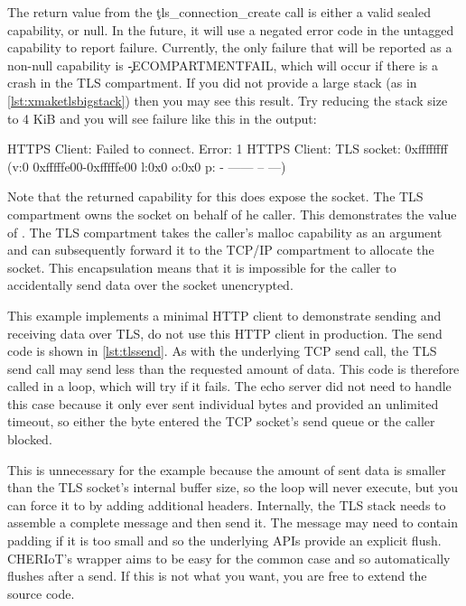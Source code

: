 \codelisting[filename=examples/tls/https.cc,marker=tls_connect,label=lst:tlsconnect,caption="Connecting to a remote server with TLS."]{}

The return value from the \c{tls_connection_create} call is either a valid sealed capability, or null.
In the future, it will use a negated error code in the untagged capability to report failure.
Currently, the only failure that will be reported as a non-null capability is \c{-ECOMPARTMENTFAIL}, which will occur if there is a crash in the TLS compartment.
If you did not provide a large stack (as in \ref{lst:xmaketlsbigstack}) then you may see this result.
Try reducing the stack size to 4 KiB and you will see failure like this in the output:

\begin{console}
HTTPS Client: Failed to connect.  Error: 1
HTTPS Client: TLS socket: 0xffffffff (v:0 0xfffffe00-0xfffffe00 l:0x0 o:0x0 p: - ------ -- ---)
\end{console}

Note that the returned capability for this does  expose the socket.
The TLS compartment owns the socket on behalf of he caller.
This demonstrates the value of .
The TLS compartment takes the caller's malloc capability as an argument and can subsequently forward it to the TCP/IP compartment to allocate the socket.
This encapsulation means that it is impossible for the caller to accidentally send data over the socket unencrypted.

This example implements a minimal HTTP client to demonstrate sending and receiving data over TLS, do not use this HTTP client in production.
The send code is shown in \ref{lst:tlssend}.
As with the underlying TCP send call, the TLS send call may send less than the requested amount of data.
This code is therefore called in a loop, which will try if it fails.
The echo server did not need to handle this case because it only ever sent individual bytes and provided an unlimited timeout, so either the byte entered the TCP socket's send queue or the caller blocked.

This is unnecessary for the example because the amount of sent data is smaller than the TLS socket's internal buffer size, so the loop will never execute, but you can force it to by adding additional headers.
Internally, the TLS stack needs to assemble a complete message and then send it.
The message may need to contain padding if it is too small and so the underlying APIs provide an explicit flush.
CHERIoT's wrapper aims to be easy for the common case and so automatically flushes after a send.
If this is not what you want, you are free to extend the source code.


